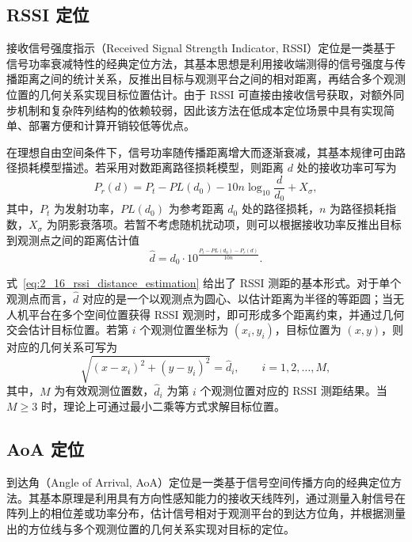 \subsection{RSSI 定位}
\label{subsec:2_3_1}

接收信号强度指示（Received Signal Strength Indicator, RSSI）定位是一类基于信号功率衰减特性的经典定位方法，其基本思想是利用接收端测得的信号强度与传播距离之间的统计关系，反推出目标与观测平台之间的相对距离，再结合多个观测位置的几何关系实现目标位置估计。由于 RSSI 可直接由接收信号获取，对额外同步机制和复杂阵列结构的依赖较弱，因此该方法在低成本定位场景中具有实现简单、部署方便和计算开销较低等优点。

在理想自由空间条件下，信号功率随传播距离增大而逐渐衰减，其基本规律可由路径损耗模型描述。若采用对数距离路径损耗模型，则距离 $d$ 处的接收功率可写为
\begin{equation}
P_r(d)
=
P_t
-
PL(d_0)
-
10n\log_{10}\frac{d}{d_0}
+
X_{\sigma},
\label{eq:2_15_rssi_pathloss_model}
\end{equation}
其中，$P_t$ 为发射功率，$PL(d_0)$ 为参考距离 $d_0$ 处的路径损耗，$n$ 为路径损耗指数，$X_{\sigma}$ 为阴影衰落项。若暂不考虑随机扰动项，则可以根据接收功率反推出目标到观测点之间的距离估计值
\begin{equation}
\hat d
=
d_0
\cdot
10^{\frac{P_t-PL(d_0)-P_r(d)}{10n}}.
\label{eq:2_16_rssi_distance_estimation}
\end{equation}

式~\eqref{eq:2_16_rssi_distance_estimation} 给出了 RSSI 测距的基本形式。对于单个观测点而言，$\hat d$ 对应的是一个以观测点为圆心、以估计距离为半径的等距圆；当无人机平台在多个空间位置获得 RSSI 观测时，即可形成多个距离约束，并通过几何交会估计目标位置。若第 $i$ 个观测位置坐标为 $(x_i,y_i)$，目标位置为 $(x,y)$，则对应的几何关系可写为
\begin{equation}
\sqrt{(x-x_i)^2+(y-y_i)^2}
=
\hat d_i,
\qquad i=1,2,\dots,M,
\label{eq:2_17_rssi_geometry_constraint}
\end{equation}
其中，$M$ 为有效观测位置数，$\hat d_i$ 为第 $i$ 个观测位置对应的 RSSI 测距结果。当 $M\geq 3$ 时，理论上可通过最小二乘等方式求解目标位置。


\subsection{AoA 定位}
\label{subsec:2_3_2}

到达角（Angle of Arrival, AoA）定位是一类基于信号空间传播方向的经典定位方法。其基本原理是利用具有方向性感知能力的接收天线阵列，通过测量入射信号在阵列上的相位差或功率分布，估计信号相对于观测平台的到达方位角，并根据测量出的方位线与多个观测位置的几何关系实现对目标的定位。

